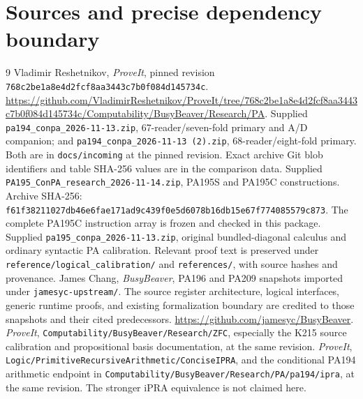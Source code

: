 \documentclass[11pt,letterpaper]{article}
\newcommand{\file}[1]{\texttt{\nolinkurl{#1}}}
\begin{document}
\clearpage
\section{Sources and precise dependency boundary}
\label{app:sources}
\begin{thebibliography}{9}
 Vladimir Reshetnikov, \emph{ProveIt}, pinned revision
\file{768c2be1a8e4d2fcf8aa3443c7b0f084d145734c}.
\url{https://github.com/VladimirReshetnikov/ProveIt/tree/768c2be1a8e4d2fcf8aa3443c7b0f084d145734c/Computability/BusyBeaver/Research/PA}.
 Supplied \file{pa194_conpa_2026-11-13.zip},
67-reader/seven-fold primary and A/D companion; and
\file{pa194_conpa_2026-11-13 (2).zip}, 68-reader/eight-fold primary.
Both are in \file{docs/incoming} at the pinned revision. Exact archive
Git blob identifiers and table SHA-256 values are in the comparison data.
 Supplied \file{PA195_ConPA_research_2026-11-14.zip},
PA195S and PA195C constructions. Archive SHA-256:
\file{f61f38211027db46e6fae171ad9c439f0e5d6078b16db15e67f774085579c873}.
The complete PA195C instruction array is frozen and checked in this package.
 Supplied \file{pa195_conpa_2026-11-13.zip}, original
bundled-diagonal calculus and ordinary syntactic PA calibration.
Relevant proof text is preserved under \file{reference/logical_calibration/}
and \file{references/}, with source hashes and provenance.
 James Chang, \emph{BusyBeaver}, PA196 and PA209
snapshots imported under \file{jamesyc-upstream/}. The source register
architecture, logical interfaces, generic runtime proofs, and existing
formalization boundary are credited to those snapshots and their cited
predecessors. \url{https://github.com/jamesyc/BusyBeaver}.
 \emph{ProveIt},
\file{Computability/BusyBeaver/Research/ZFC}, especially the K215 source
calibration and propositional basis documentation, at the same revision.
 \emph{ProveIt},
\file{Logic/PrimitiveRecursiveArithmetic/ConciseIPRA}, and the conditional
PA194 arithmetic endpoint in \file{Computability/BusyBeaver/Research/PA/pa194/ipra},
at the same revision. The stronger iPRA equivalence is not claimed here.
\end{thebibliography}
\end{document}

